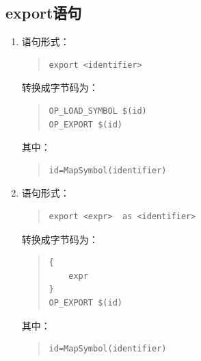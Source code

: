 \subsection{export语句}
\begin{enumerate}
\item 语句形式：
\begin{quote}
\begin{verbatim}
export <identifier>
\end{verbatim}
\end{quote}
转换成字节码为：
\begin{quote}
\begin{verbatim}
OP_LOAD_SYMBOL $(id)
OP_EXPORT $(id)
\end{verbatim}
\end{quote}
其中：
\begin{quote}
\begin{verbatim}
id=MapSymbol(identifier) 
\end{verbatim}
\end{quote}

\item 语句形式：
\begin{quote}
\begin{verbatim}
export <expr>  as <identifier>
\end{verbatim}
\end{quote}
转换成字节码为：
\begin{quote}
\begin{verbatim}
{
    expr
}
OP_EXPORT $(id)
\end{verbatim}
\end{quote}
其中：
\begin{quote}
\begin{verbatim}
id=MapSymbol(identifier) 
\end{verbatim}
\end{quote}

\end{enumerate}
